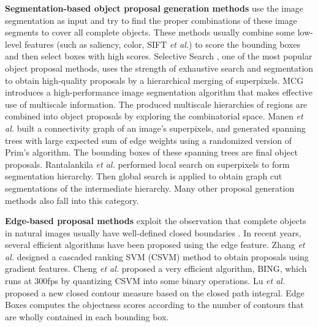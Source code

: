 \documentclass[10pt,twocolumn,letterpaper]{article}
\newcommand{\myPara}[1]{\vspace{.1in}\noindent\textbf{#1}}
\def\etal{{\em et al.}}
\begin{document}
\myPara{Segmentation-based object proposal generation methods}
use the image segmentation as input and try to find the proper combinations
of these image segments to cover all complete objects.
These methods usually combine some low-level features (such as saliency, color,
SIFT \etal) to score the bounding boxes and then select boxes with high scores.
%
Selective Search \cite{uijlings2013selective}, one of the most popular
object proposal methods, uses the strength of exhaustive search and segmentation
to obtain high-quality proposals by a hierarchical merging of superpixels.
%
MCG \cite{arbelaez2014multiscale} introduces a high-performance image 
segmentation algorithm that makes effective use of multiscale information.
The produced multiscale hierarchies of regions are combined into object 
proposals by exploring the combinatorial space.
%
Manen \etal \cite{manen2013prime} built a connectivity graph of an image's 
superpixels, and generated spanning trees with large expected sum of edge weights
using a randomized version of Prim's algorithm.
The bounding boxes of these spanning trees are final object proposals.
%
Rantalankila \etal \cite{rantalankila2014generating} performed local 
search on superpixels to form segmentation hierarchy.
Then global search is applied to obtain graph cut segmentations of the 
intermediate hierarchy.
%
Many other proposal generation methods 
\cite{rahtu2011learning,endres2014category,krahenbuhl2015learning} 
also fall into this category.


\myPara{Edge-based proposal methods} exploit the observation that complete objects
in natural images usually have well-defined closed boundaries \cite{alexe2012measuring}.
In recent years, several efficient algorithms have been proposed using the edge feature.
Zhang \etal \cite{zhang2016object} designed a cascaded ranking SVM (CSVM) method
to obtain proposals using gradient features.
Cheng \etal \cite{cheng2014bing} proposed a very efficient algorithm, BING, which
runs at 300fps by quantizing CSVM \cite{zhang2016object} into some binary operations.
Lu \etal \cite{lu2015contour} proposed a new closed contour measure
based on the closed path integral.
Edge Boxes \cite{zitnick2014edge} computes the objectness scores according to
the number of contours that are wholly contained in each bounding box.
\end{document}
